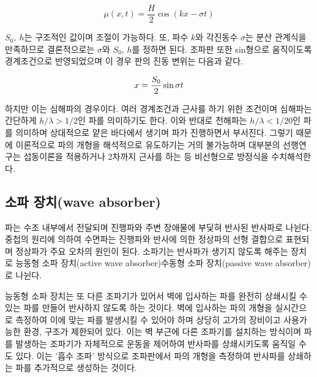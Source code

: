 \begin{equation} \label{eq:6}
{
    \mu(x, t)=\frac{H}{2} \cos (k x-\sigma t)
}
\end{equation}


$S_0,~h$는 구조적인 값이며 조절이 가능하다. 또, 파수 $k$와 각진동수 $\sigma$는 분산 관계식을 만족하므로 결론적으로는 $\sigma$와 $S_0$, $h$를 정하면 된다. 조파판 또한 sin형으로 움직이도록 경계조건으로 반영되었으며 이 경우 판의 진동 변위는 다음과 같다.

\begin{equation} \label{eq:7}
{
    x = {{S_0}\over2} \sin{\sigma t}
}
\end{equation}

하지만 이는 심해파의 경우이다. 여러 경계조건과 근사를 하기 위한 조건이며 심해파는 간단하게 $h/\lambda > 1/2$인 파를 의미하기도 한다. 이와 반대로 천해파는 $h/\lambda < 1/20$인 파를 의미하며 상대적으로 얕은 바다에서 생기며 파가 진행하면서 부서진다. 그렇기 때문에 이론적으로 파의 개형을 해석적으로 유도하기는 거의 불가능하며 대부분의 선행연구는 섭동이론을 적용하거나 2차까지 근사를 하는 등 비선형으로 방정식을 수치해석한다\cite{society1993laboratory}. 

\subsection{소파 장치(wave absorber)}
파는 수조 내부에서 전달되며 진행파와 주변 장애물에 부딫혀 반사된 반사파로 나뉜다. 중첩의 원리에 의하여 수면파는 진행파와 반사에 의한 정상파의 선형 결합으로 표현되며 정상파가 주요 오차의 원인이 된다. 소파기는 반사파가 생기지 않도록 해주는 장치로 능동형 소파 장치(active wave absorber)\와 수동형 소파 장치(passive wave absorber)로 나뉜다\cite{ouellet1986survey}.


능동형 소파 장치는 또 다른 조파기가 있어서 벽에 입사하는 파를 완전히 상쇄시킬 수 있는 파를 만들어 반사하지 않도록 하는 것이다. 벽에 입사하는 파의 개형을 실시간으로 측정하여 이에 맞는 파를 발생시킬 수 있어야 하며 상당히 고가의 장비이고 사용가능한 환경, 구조가 제한되어 있다. 이는 벽 부근에 다른 조파기를 설치하는 방식이며 파를 발생하는 조파기가 자체적으로 운동을 제어하여 반사파를 상쇄시키도록 움직일 수도 있다. 이는 '흡수 조파' 방식으로 조파판에서 파의 개형을 측정하여 반사파를 상쇄하는 파를 추가적으로 생성하는 것이다.

